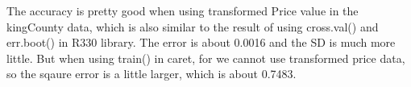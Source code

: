 \documentclass{article}%
\begin{document}
The accuracy is pretty good when using transformed Price value in the kingCounty data, which is also similar to the result of using cross.val() and err.boot() in R330 library. The error is about 0.0016 and the SD is much more little. But when using train() in caret, for we cannot use transformed price data, so the sqaure error is a little larger, which is about 0.7483.

\end{document}
